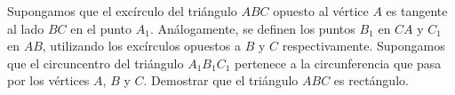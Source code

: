 Supongamos que el excírculo del triángulo $ABC$ opuesto al vértice $A$ es tangente al lado $BC$ en el punto $A_1$. Análogamente, se definen los puntos $B_1$ en $CA$ y $C_1$ en $AB$, utilizando los excírculos opuestos a $B$ y $C$ respectivamente. Supongamos que el circuncentro del triángulo $A_1B_1C_1$ pertenece a la circunferencia que pasa por los vértices $A$, $B$ y $C$. Demostrar que el triángulo $ABC$ es rectángulo.